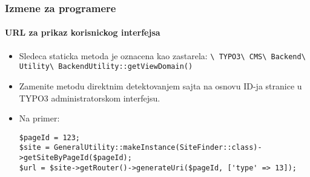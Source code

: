 \begin{frame}[fragile]
	\frametitle{Izmene za programere}
	\framesubtitle{URL za prikaz korisnickog interfejsa}

	\lstset{basicstyle=\tiny\ttfamily}

	\begin{itemize}
		\item Sledeca staticka metoda je oznacena kao zastarela:\newline
			\smaller\texttt{\textbackslash
				TYPO3\textbackslash
				CMS\textbackslash
				Backend\textbackslash
				Utility\textbackslash
				BackendUtility::getViewDomain()}\normalsize

		\item Zamenite metodu direktnim detektovanjem sajta na osnovu ID-ja stranice u TYPO3 administratorskom interfejsu.
		\item Na primer:

\begin{lstlisting}
$pageId = 123;
$site = GeneralUtility::makeInstance(SiteFinder::class)->getSiteByPageId($pageId);
$url = $site->getRouter()->generateUri($pageId, ['type' => 13]);
\end{lstlisting}

	\end{itemize}

\end{frame}


